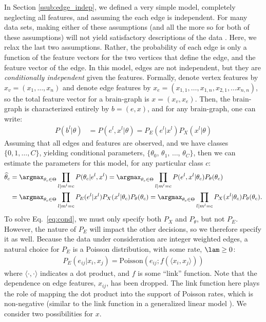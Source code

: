 \documentclass{article}
\begin{document}
In Section \ref{ssub:edge_indep}, we defined a very simple model, completely neglecting all features, and assuming the each edge is independent.  For many data sets, making either of these assumptions (and all the more so for both of these assumptions) will not yield satisfactory descriptions of the data \cite{?}.  Here, we relax the last two assumptions.  Rather, the probability of each edge is only a function of the feature vectors for the two vertices that define the edge, and the feature vector of the edge.  In this model, edges are not independent, but they are \emph{conditionally independent} given the features.   Formally, denote vertex features by $x_v=(x_1, \ldots, x_{n})$ and denote edge features by $x_e=(x_{1,1}, \ldots, x_{1,n}, x_{2,1}, \ldots x_{n,n})$, so the total feature vector for a brain-graph is $x=(x_v, x_e)$.  Then, the brain-graph is characterized entirely by $b=(e,x)$, and for any brain-graph, one can write:
\begin{align}
	P(b^l | \theta) &= P(e^l, x^l | \theta) = P_E(e^l | x^l) P_X(x^l | \theta) 
\end{align}
Assuming that all edges and features are observed, and we have classes $\{0,1,\ldots,C\}$, yielding conditional parameters, $\{\theta_0$, $\theta_1$, $\ldots$, $\theta_C\}$, then we can estimate the parameters for this model, for any particular class $c$:
\begin{align}
\widehat{\theta}_c 	&= \argmax_{\theta_c \in \Theta} \prod_{l | m^l=c} P(\theta_c | e^l, x^l) %
		= \argmax_{\theta_c \in \Theta} \prod_{l | m^l=c} P(e^l, x^l | \theta_c) P_{\theta}(\theta_c) \nonumber \\
		&= \argmax_{\theta_c \in \Theta} \prod_{l | m^l=c} P_E(e^l | x^l) P_X(x^l | \theta_c) P_{\theta}(\theta_c) 					 					
		= \argmax_{\theta_c \in \Theta} \prod_{l | m^l=c}  P_X(x^l | \theta_c) P_{\theta}(\theta_c).  \label{eq:cond}
\end{align}
To solve Eq.~\ref{eq:cond}, we must only specify both $P_X$ and $P_{\theta}$, but not $P_E$.  However, the nature of $P_E$ will impact the other decisions, so we therefore specify it as well.  Because the data under consideration are integer weighted edges, a natural choice for $P_E$ is a Poisson distribution, with some rate, $\lam \geq 0$:
\begin{align} \label{eq:E}
	P_E(e_{ij} | x_i,x_j) = \text{Poisson}(e_{ij}; f(\langle x_i, x_j \rangle))
\end{align}
where $\langle \cdot, \cdot \rangle$ indicates a dot product, and $f$ is some ``link'' function.  Note that the dependence on edge features, $x_{ij}$, has been dropped.  The link function here plays the role of mapping the dot product into the support of Poisson rates, which is non-negative (similar to the link function in a generalized linear model \cite{McCullaghNelder89}).  We consider two possibilities for $x$.
\end{document}
